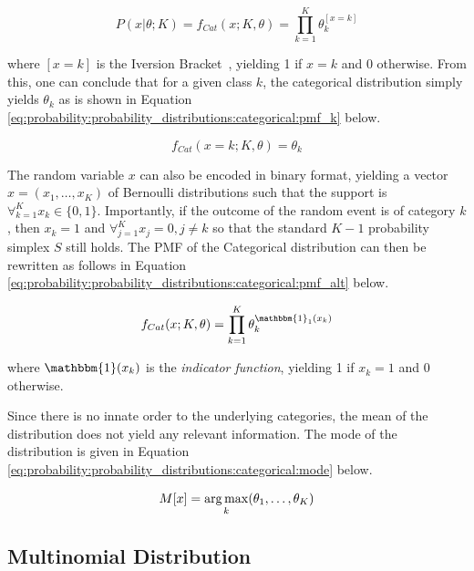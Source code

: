 \begin{equation}
      \label{eq:probability:probability_distributions:categorical:pmf}
      P(x \vert \theta; K) = f_{Cat}(x; K, \theta) = \prod_{k=1}^{K}\theta_{k}^{[x = k]}
\end{equation}

where $[x = k]$ is the Iversion Bracket~\cite{ref:iverson:1962}, yielding 1 if $x = k$ and 0 otherwise. From this, one can conclude that for a given class $k$, the categorical distribution simply yields $\theta_{k}$ as is shown in Equation \ref{eq:probability:probability_distributions:categorical:pmf_k} below.

\begin{equation}
      \label{eq:probability:probability_distributions:categorical:pmf_k}
      f_{Cat}(x=k; K, \theta) = \theta_{k}
\end{equation}

The random variable $x$ can also be encoded in binary format, yielding a vector $x = (x_{1}, \dots, x_{K})$ of Bernoulli distributions such that the support is $\forall_{k=1}^{K} x_{k} \in \{0, 1\}$. Importantly, if the outcome of the random event is of category $k$, then $x_{k} = 1$ and $\forall_{j=1}^{K} x_{j} = 0, j \neq k$ so that the standard $K-1$ probability simplex $S$ still holds. The \ac{PMF} of the Categorical distribution can then be rewritten as follows in Equation \ref{eq:probability:probability_distributions:categorical:pmf_alt} below.

\begin{equation}
      \label{eq:probability:probability_distributions:categorical:pmf_alt}
      f_{Cat}(x; K, \theta) = \prod_{k=1}^{K}\theta_{k}^{\mathbbm{1}_{1}(x_{k})}
\end{equation}

where $\mathbbm{1}(x_{k})$ is the \textit{indicator function}, yielding 1 if $x_{k} = 1$ and 0 otherwise.

Since there is no innate order to the underlying categories, the mean of the distribution does not yield any relevant information. The mode of the distribution is given in Equation \ref{eq:probability:probability_distributions:categorical:mode} below.

\begin{equation}
      \label{eq:probability:probability_distributions:categorical:mode}
      M[x] = \operatorname*{arg\,max}_{k}(\theta_{1}, \dots, \theta_{K})
\end{equation}


\subsection{Multinomial Distribution}
\label{sec:probability:probability_distributions:multinomial}

